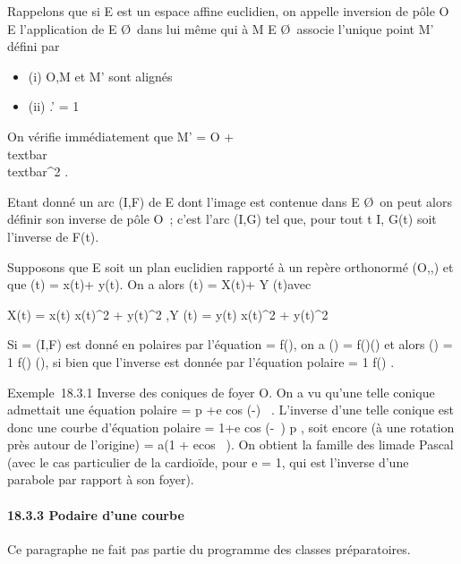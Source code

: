 Rappelons que si E est un espace affine euclidien, on appelle inversion
de pôle O \in E l'application de E \diagdown\O\
dans lui même qui à M \in E \diagdown\O\ associe
l'unique point M' défini par

\begin{itemize}
\itemsep1pt\parskip0pt
\item
  (i) O,M et M' sont alignés
\item
  (ii) \overlineOM.\overlineOM' =
  1
\end{itemize}

On vérifie immédiatement que M' = O +
\overrightarrowOM \over
\\textbar{}\overrightarrowOM\\textbar{}^2
.

Etant donné un arc (I,F) de E dont l'image est contenue dans E
\diagdown\O\, on peut alors définir son
inverse de pôle O~; c'est l'arc (I,G) tel que, pour tout t \in I, G(t)
soit l'inverse de F(t).

Supposons que E soit un plan euclidien rapporté à un repère orthonormé
(O,\vec\imath,) et que
\overrightarrowOF(t) = x(t)\vec\imath +
y(t). On a alors
\overrightarrowOG(t) = X(t)\vec\imath +
Y (t)\vecȷ avec

X(t) = x(t) \over x(t)^2 +
y(t)^2 ,\quad Y (t) = y(t)
\over x(t)^2 + y(t)^2

Si \Gamma = (I,F) est donné en polaires par l'équation \rho = f(\theta), on a
\overrightarrowOF(\theta) =
f(\theta)\vecu(\theta) et alors
\overrightarrowOG(\theta) = 1 \over
f(\theta) \vecu(\theta), si bien que l'inverse est donnée par
l'équation polaire \rho = 1 \over f(\theta) .

Exemple~18.3.1 Inverse des coniques de foyer O. On a vu qu'une telle
conique admettait une équation polaire \rho = p +e cos (\theta-)~ . L'inverse d'une
telle conique est donc une courbe d'équation polaire \rho =
1+e cos (\theta-\theta0~) \over
p , soit encore (à une rotation près autour de l'origine) \rho = a(1 +
ecos~ \theta). On obtient la famille des
lima\ccons de Pascal (avec le cas particulier de la
cardioïde, pour e = 1, qui est l'inverse d'une parabole par rapport à
son foyer).

\paragraph{18.3.3 Podaire d'une courbe}

Ce paragraphe ne fait pas partie du programme des classes préparatoires.

